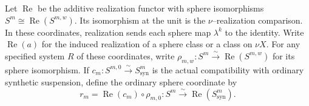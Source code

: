 \begin{definition}
Let $\operatorname{Re}$ be the additive realization functor with sphere isomorphisms $S^m\cong\operatorname{Re}(S^{m,w})$. Its isomorphism at the unit is the $\nu$--realization comparison. In these coordinates, realization sends each sphere map $\lambda^k$ to the identity. Write $\operatorname{Re}(a)$ for the induced realization of a sphere class or a class on $\nu X$.
For any specified system $R$ of these coordinates, write
$\rho_{m,w}:S^m\xrightarrow{\sim}\operatorname{Re}(S^{m,w})$ for its
sphere isomorphism. If $c_m:S^{m,0}\xrightarrow{\sim}S^m_{\mathrm{syn}}$
is the actual compatibility with ordinary synthetic suspension, define
the ordinary sphere coordinate by
\[
r_m=\operatorname{Re}(c_m)\circ\rho_{m,0}:
S^m\xrightarrow{\sim}\operatorname{Re}(S^m_{\mathrm{syn}}).
\]
\end{definition}

